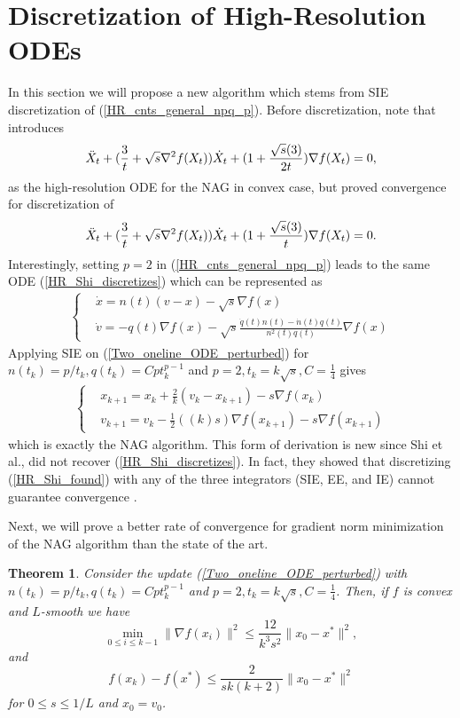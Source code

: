 \documentclass{article}
\theoremstyle{plain}
\newtheorem{thm}{\textbf{Theorem}}
\theoremstyle{definition}
\theoremstyle{remark}
\begin{document}
\section{Discretization of High-Resolution ODEs}
In this section we will propose a new algorithm which stems from SIE discretization of (\ref{HR_cnts_general_npq_p}). Before discretization, note that \cite{shi2019acceleration} introduces 
\begin{align}\label{HR_Shi_found}
     \Ddot{X}_t + (\frac{3}{t}+\sqrt{s}\nabla^2 f(X_t))\dot{X}_t+(1+\frac{\sqrt{s}(3)}{2t})\nabla f(X_t)=0,
\end{align}
as the high-resolution ODE for the NAG in convex case, but proved convergence for discretization of \begin{align}\label{HR_Shi_discretizes}
     \Ddot{X}_t + (\frac{3}{t}+\sqrt{s}\nabla^2 f(X_t))\dot{X}_t+(1+\frac{\sqrt{s}(3)}{t})\nabla f(X_t)=0.
\end{align}
Interestingly, setting $p=2$ in (\ref{HR_cnts_general_npq_p}) leads to the same ODE (\ref{HR_Shi_discretizes}) which can be represented as
\begin{align}\label{Two_oneline_ODE_perturbed}
   \left\{ \begin{array}{ll}
    & \dot{x}   =     n(t)(v-x)-\sqrt{s}\nabla f(x)\\
     &\dot{v}    =  -q(t)\nabla f(x) - \sqrt{s}\frac{\dot q(t)n(t)-\dot n(t)q(t)}{n^2(t)q(t)} \nabla f(x)
    \end{array}\right.
\end{align}
Applying SIE on (\ref{Two_oneline_ODE_perturbed}) for $n(t_k)=p/t_k,q(t_k)=Cpt_k^{p-1}$ and $p=2,t_k=k\sqrt{s},C=\tfrac{1}{4}$ gives 
\begin{align}\label{new_algorithm}
   \left\{ \begin{array}{ll}
    &x_{k+1}   =    x_{k} + \frac{2}{k}(v_k-x_{k+1})-{s}\nabla f(x_k)\\
     &v_{k+1}    = v_k -\tfrac{1}{2}((k)s)\nabla f(x_{k+1})-s\nabla f(x_{k+1}) 
    \end{array}\right.
\end{align}
 which is exactly the NAG algorithm. This form of derivation is new since Shi et al., did not recover (\ref{HR_Shi_discretizes}). In fact, they showed that discretizing (\ref{HR_Shi_found}) with any of the three integrators (SIE, EE, and IE) cannot guarantee convergence \cite{shi2019acceleration}. \par
Next, we will prove a better rate of convergence for gradient norm minimization of the NAG algorithm than the state of the art. 
\begin{thm}\label{theorem4}
    Consider the update (\ref{Two_oneline_ODE_perturbed}) with $n(t_k)=p/t_k,q(t_k)=Cpt_k^{p-1}$ and $p=2,t_k=k\sqrt{s},C=\tfrac{1}{4}$. Then, if $f$ is convex and $L$-smooth we have
    $$\min_{0\leq i\leq k-1}\|\nabla f(x_i)\|^2 \leq \frac{12}{k^3s^2}\|x_0-x^*\|^2,$$
    and
    $$f(x_k)-f(x^*)\leq \frac{2}{sk(k+2)}\|x_0-x^*\|^2$$
    for $0\leq s\leq 1/L$ and $x_0=v_0$.
\end{thm}
\end{document}

